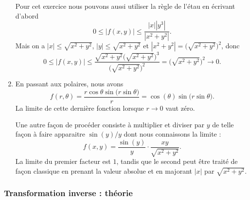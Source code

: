 \begin{example}
\begin{enumerate}
		      Pour cet exercice nous pouvons aussi utiliser la règle de l'étau en écrivant d'abord
		      \begin{equation}
			      0\leq | f(x,y) |\leq\frac{ | x | |y^3 | }{ | x^2+y^2 | }.
		      \end{equation}
		      Mais on a \( | x |\leq\sqrt{x^2+y^2}\), \( | y |\leq\sqrt{x^2+y^2}\) et \( | x^2+y^2 |=\big( \sqrt{x^2+y^2} \big)^2\), donc
		      \begin{equation}
			      0\leq| f(x,y) |\leq \frac{ \sqrt{x^2+y^2}\big( \sqrt{x^2+y^2} \big)^3 }{ \big( \sqrt{x^2+y^2} \big)^2 }=\big( \sqrt{x^2+y^2} \big)^2\to 0.
		      \end{equation}

		\item
		      En passant aux polaires, nous avons
		      \begin{equation}
			      f(r,\theta)=\frac{ r\cos\theta\sin\big( r\sin\theta \big) }{ r }=\cos(\theta)\sin\big( r\sin\theta \big).
		      \end{equation}
		      La limite de cette dernière fonction lorsque \( r\to 0\) vaut zéro.

		      Une autre façon de procéder consiste à multiplier et diviser par \( y\) de telle façon à faire apparaitre \( \sin(y)/y\) dont nous connaissons la limite :
		      \begin{equation}
			      f(x,y)=\frac{ \sin(y) }{ y }\cdot\frac{ xy }{ \sqrt{x^2+y^2} }.
		      \end{equation}
		      La limite du premier facteur est \( 1\), tandis que le second peut être traité de façon classique en prenant la valeur absolue et en majorant \( | x |\) par \( \sqrt{x^2+y^2}\).

	\end{enumerate}
\end{example}

\subsubsection{Transformation inverse : théorie}

